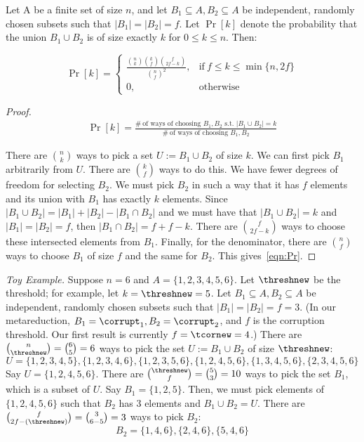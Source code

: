 \begin{lemma}\label{lemma:sets}
Let A be a finite set of size $n$, and let $B_1 \subseteq A, B_2 \subseteq A$ be independent, randomly chosen subsets such that $\lvert B_1 \rvert = \lvert B_2 \rvert = f$.
Let $\Pr[k]$ denote the probability that the union $B_1 \cup B_2$ is of size exactly $k$ for $0 \leq k \leq n$. Then:

   \begin{equation}\label{eqn:Pr}
\Pr[k] =
    \begin{cases}
      \frac{\binom{n}{k} \binom{k}{f} \binom{f}{2f - k}}{\binom{n}{f}^2}, & \text{if}\ f \leq k \leq \min\{n, 2f\} \\
      0, & \text{otherwise}
    \end{cases}
  \end{equation}

\end{lemma}

\begin{proof}

\begin{align}
\Pr[k] = \frac{\#~\text{of ways of choosing $B_1, B_2$ s.t. $\lvert B_1 \cup B_2 \rvert = k$}}{\#~\text{of ways of choosing $B_1, B_2$}}
\end{align}

There are $\binom{n}{k}$ ways to pick a set $U := B_1 \cup B_2$ of size $k$.
We can first pick $B_1$ arbitrarily from $U$.  There are $\binom{k}{f}$ ways to do this.
We have fewer degrees of freedom for selecting $B_2$.
We must pick $B_2$ in such a way that it has $f$ elements and its union with $B_1$ has exactly $k$ elements.
Since $\lvert B_1 \cup B_2 \rvert = \lvert B_1 \rvert + \lvert B_2 \rvert - \lvert B_1 \cap B_2 \rvert$ and we must have that $\lvert B_1 \cup B_2 \rvert = k$ and $\lvert B_1 \rvert = \lvert B_2 \rvert = f$,
then $\lvert B_1 \cap B_2 \rvert = f + f - k$.  There are $\binom{f}{2f-k}$ ways to choose these intersected elements from $B_1$.
Finally, for the denominator, there are $\binom{n}{f}$ ways to choose $B_1$ of size $f$ and the same for $B_2$.
This gives~\cref{eqn:Pr}.
\end{proof}
\textit{Toy Example.} Suppose $n = 6$ and $A = \{1, 2, 3, 4, 5, 6\}$.
Let $\threshnew$ be the threshold; for example, let $k = \threshnew = 5$.
Let $B_1 \subseteq A, B_2 \subseteq A$ be independent, randomly chosen subsets such that $\lvert B_1 \rvert = \lvert B_2 \rvert = f = 3$.
(In our metareduction, $B_1 = \corrupt_1, B_2 = \corrupt_2$, and $f$ is the corruption threshold.
Our first result is currently $f = \tcornew = 4$.)
There are $\binom{n}{\threshnew} = \binom{6}{5} = 6$ ways to pick the set $U := B_1 \cup B_2$ of size $\threshnew$:
$$U = \{1, 2, 3, 4, 5\}, \{1, 2, 3, 4, 6\}, \{1, 2, 3, 5, 6\}, \{1, 2, 4, 5, 6\}, \{1, 3, 4, 5, 6\}, \{2, 3, 4, 5, 6\}$$
Say $U = \{1, 2, 4, 5, 6\}$.
There are $\binom{\threshnew}{f} = \binom{5}{3} = 10$ ways to pick the set $B_1$, which is a subset of $U$.
Say $B_1 = \{1, 2, 5\}$.
Then, we must pick elements of $\{1, 2, 4, 5, 6\}$ such that $B_2$ has $3$ elements and $B_1 \cup B_2 = U$.
There are $\binom{f}{2f-(\threshnew)} = \binom{3}{6-5} = 3$ ways to pick $B_2$:
$$B_2 = \{1, 4, 6\}, \{2, 4, 6\}, \{5, 4, 6\}$$

